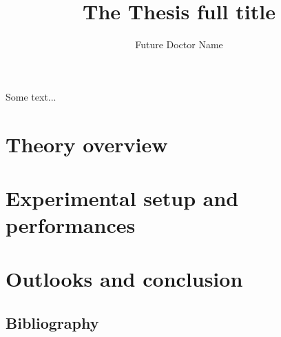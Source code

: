 \documentclass[11pt, twoside, openright]{thesis}
\title{The Thesis full title}
\author{Future Doctor Name}
\begin{document}
\frontmatter

\maketitle

\dominitoc %


\begin{dedication}
  Some text... 
\end{dedication}




\newpage
\hypertarget{contents}{}
\tableofcontents




\mainmatter



\part{Theory overview}


\part{Experimental setup and performances}



\part{Outlooks and conclusion}



\chapter*{Bibliography}
\bibbysegment[heading=subbibliography]

\appendix



\backmatter

\end{document}
